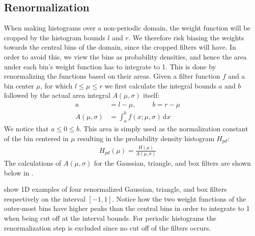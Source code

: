 \documentclass[thesis.tex]{subfiles}
\begin{document}
\subsection{Renormalization}
When making histograms over a non-periodic domain, the weight function will be cropped by the histogram bounds $l$ and $r$. We therefore risk biasing the weights towards the central bins of the domain, since the cropped filters will have. In order to avoid this, we view the bins as probability densities, and hence the area under each bin's weight function has to integrate to 1. This is done by renormalizing the functions based on their areas. Given a filter function $f$ and a bin center $\mu$, for which $l \leq \mu \leq r$ we first calculate the integral bounds $a$ and $b$ followed by the actual area integral $A(\mu,\sigma)$ itself:
\begin{align*}
	a &= l - \mu,\hspace{1cm}
	b = r - \mu \\
	A(\mu,\sigma) &= \int_a^b f(x;\mu,\sigma)\,\text{d}x
\end{align*}
We notice that $a \leq 0 \leq b$. This area is simply used as the normalization constant of the bin centered in $\mu$ resulting in the probability density histogram $H_{pd}$:
\begin{align*}
	H_{pd}(\mu) = \frac{H(\mu)}{A(\mu,\sigma)}
\end{align*}
The calculations of $A(\mu,\sigma)$ for the Gaussian, triangle, and box filters are shown below in .

 show 1D examples of four renormalized Gaussian, triangle, and box filters respectively on the interval $[-1,1]$. Notice how the two weight functions of the outer-most bins have higher peaks than the central bins in order to integrate to 1 when being cut off at the interval bounds. For periodic histograms the renormalization step is excluded since no cut off of the filters occurs.
\end{document}
